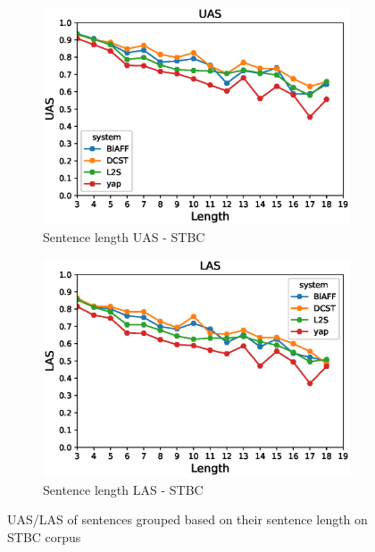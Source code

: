 \documentclass[11pt]{article}
\begin{document}
\begin{figure}[!ht]
        \centering
        \begin{subfigure}[b]{0.475\textwidth}
            \centering
            \includegraphics[width=\textwidth]{images/TestUASLength.eps}
            \caption[Network2]%
            {{\small Sentence length UAS - STBC}}    
            
        \end{subfigure}
        \hfill
        \begin{subfigure}[b]{0.475\textwidth}  
            \centering 
            \includegraphics[width=\textwidth]{images/TestLASLength.eps}
            \caption[]%
            {{\small Sentence length LAS - STBC}}    
            
        \end{subfigure}

        \caption[ UAS/LAS of sentences grouped based on their sentence length on STBC corpus ]
        {\small UAS/LAS of sentences grouped based on their sentence length on STBC corpus } 
        \label{sentLenSTBC}
    \end{figure}
\end{document}
